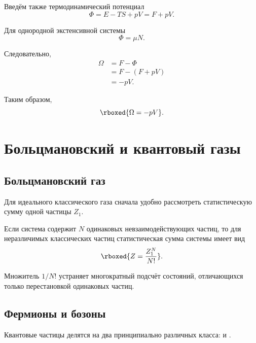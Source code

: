 \documentclass[../final.tex]{subfiles}
\begin{document}
Введём также термодинамический потенциал
%
\begin{equation*}
    \Phi
    =
    E
    -
    TS
    +
    pV
    =
    F+pV.
\end{equation*}

Для однородной экстенсивной системы
%
\begin{equation*}
    \Phi
    =
    \mu N.
\end{equation*}

Следовательно,
%
\begin{align*}
    \Omega
    &=
    F-\Phi
    \\[4pt]
    &=
    F-(F+pV)
    \\[4pt]
    &=
    -pV.
\end{align*}

Таким образом,
%
\[
    \rboxed{
        \Omega
        =
        -pV
    }.
\]


\section{Больцмановский и квантовый газы}


\subsection{Больцмановский газ}

Для идеального классического газа сначала удобно рассмотреть
статистическую сумму одной частицы $Z_1$.

Если система содержит $N$ одинаковых невзаимодействующих частиц,
то для неразличимых классических частиц статистическая сумма системы
имеет вид
%
\[
    \rboxed{
        Z
        =
        \frac{Z_1^N}{N!}
    }.
\]

Множитель $1/N!$ устраняет многократный подсчёт состояний,
отличающихся только перестановкой одинаковых частиц.


\subsection{Фермионы и бозоны}

Квантовые частицы делятся на два принципиально различных класса:
 и .
\end{document}
